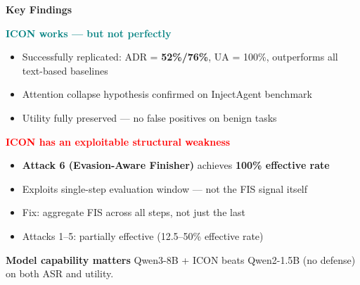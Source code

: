 \documentclass[aspectratio=169]{beamer}
\begin{document}
\begin{frame}{\textcolor{cmindsblue}{\textbf{Key Findings}}}
  \vspace{-0.3cm}
  \begin{block}{\textbf{\textcolor{teal}{ICON works — but not perfectly}}}
    {\small
    \begin{itemize}
      \item Successfully replicated: ADR = \textbf{52\%/76\%}, UA = 100\%,
            outperforms all text-based baselines
      \item Attention collapse hypothesis confirmed on InjectAgent benchmark
      \item Utility fully preserved — no false positives on benign tasks
    \end{itemize}
    }
  \end{block}
  \vspace{2mm}
  \begin{block}{\textbf{\textcolor{red}{ICON has an exploitable structural weakness}}}
    {\small
    \begin{itemize}
      \item \textbf{Attack 6 (Evasion-Aware Finisher)} achieves \textbf{100\% effective rate}
      \item Exploits single-step evaluation window — not the FIS signal itself
      \item Fix: aggregate FIS across all steps, not just the last
      \item Attacks 1–5: partially effective (12.5–50\% effective rate)
    \end{itemize}
    }
  \end{block}
  \vspace{2mm}
  \begin{block}{\textbf{\textcolor{cmindsblue}{Model capability matters}}}
    {\small Qwen3-8B + ICON beats Qwen2-1.5B (no defense) on both ASR and utility.}
  \end{block}
\end{frame}
\end{document}
